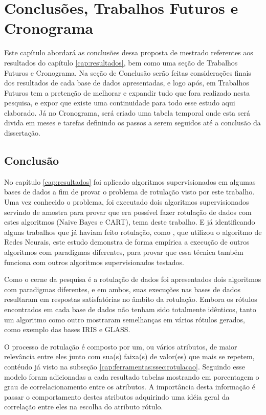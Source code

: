 \chapter{Conclusões, Trabalhos Futuros e Cronograma}\label{cap:conclusao} 

Este capítulo abordará as conclusões dessa  proposta de mestrado referentes aos resultados do capítulo \ref{cap:resultados},  bem como uma seção de Trabalhos Futuros e  Cronograma. Na seção de Conclusão serão feitas considerações finais dos resultados de cada base de dados apresentadas, e logo após, em Trabalhos Futuros tem a pretenção de melhorar e expandir tudo que fora realizado  nesta pesquisa, e expor que existe uma continuidade para todo esse estudo aqui elaborado. Já no Cronograma, será criado uma tabela temporal onde esta será divida em meses e tarefas definindo os passos a serem seguidos até a conclusão da dissertação.

\section{Conclusão}\label{cond}
No capítulo \ref{cap:resultados} foi aplicado algoritmos supervisionados em algumas bases de dados a fim de provar  o problema de rotulação visto por este  trabalho. Uma vez conhecido o problema, foi executado dois algoritmos supervisionados servindo de amostra para provar que era possível fazer rotulação de dados com estes algoritmos (Naive Bayes e CART), tema deste trabalho. E já identificando alguns trabalhos que já haviam feito rotulação, como , que utilizou o algoritmo de Redes Neurais, este estudo demonstra de forma empírica a execução de outros algoritmos com paradigmas diferentes, para provar que essa técnica também funciona com outros algoritmos supervisionados testados.

Como o cerne da pesquisa é a rotulação de dados foi apresentados dois algoritmos com paradigmas diferentes, e em ambos, suas execuções nas bases de dados resultaram em respostas satisfatórias no âmbito da rotulação. Embora os rótulos encontrados  em cada base de dados não tenham sido totalmente idênticos, tanto um algoritmo como outro mostraram semelhanças em vários rótulos gerados, como exemplo das bases IRIS e GLASS.

O processo de rotulação é composto por um, ou vários atributos, de maior relevância entre eles junto com sua(s) faixa(s) de valor(es) que mais se repetem, contéudo já visto na subseção \ref{cap:ferramentas:ssec:rotulacao}. Seguindo esse modelo foram adicionadas a cada resultado tabelas mostrando em porcentagem o grau de correlacionamento entre os atributos. A importância desta informação é passar o comportamento destes atributos adquirindo uma idéia geral da correlação entre eles na escolha do atributo rótulo.

